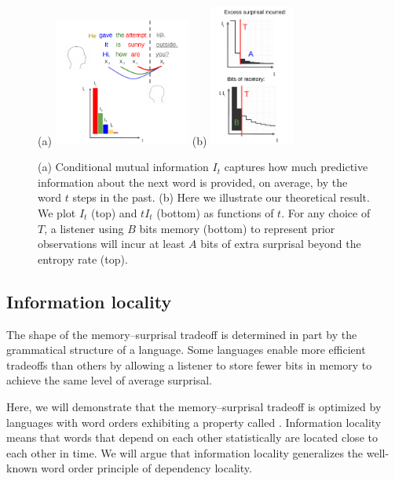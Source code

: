\begin{figure}
	(a)
\includegraphics[width=0.4\textwidth]{figures-gdrive/mi-distance.pdf}
	(b)
\includegraphics[width=0.25\textwidth]{figures-gdrive/theorem.pdf}
	\caption{
		(a) Conditional mutual information $I_t$ captures how much predictive information about the next word is provided, on average, by the word $t$ steps in the past.
		(b) Here we illustrate our theoretical result. We plot $I_t$ (top) and $tI_t$ (bottom) as functions of $t$. For any choice of $T$, a listener using $B$ bits memory (bottom) to represent prior observations will incur at least $A$ bits of extra surprisal beyond the entropy rate (top). 
}\label{fig:theorem}
\end{figure}

\subsection{Information locality}
\label{sec:infoloc}\label{sec:tradeoff}

The shape of the memory--surprisal tradeoff is determined in part by the grammatical structure of a language.
Some  languages enable more efficient tradeoffs than others by allowing a listener to store fewer bits in memory to achieve the same level of average surprisal.

Here, we will demonstrate that the memory--surprisal tradeoff is optimized by languages with word orders exhibiting a property called . Information locality means that words that depend on each other statistically are located close to each other in time. We will argue that information locality generalizes the well-known word order principle of dependency locality.

